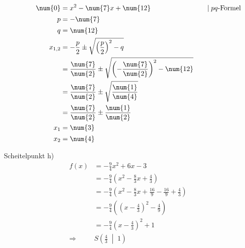 \begin{exercise}
\begin{minipage}[t]{0.49\linewidth}
        \begin{alignat*}{3}
          \noeq
          &
          \num{0}&=x^{2}-\num{7}x+\num{12}
          &
          \domod{\;\text{$pq$-Formel}}
          \\
          \noeq
          &
          p&=-\num{7}
          &
          \nomod
          \\
          \noeq
          &
          q&=\num{12}
          &
          \nomod
          \\
          \noeq
          &
          x_{1,2}&=-\frac{p}{2}\pm\sqrt{\left(\frac{p}{2}\right)^2-q}
          &
          \nomod
          \\
          \noeq
          &
          &=\frac{\num{7}}{\num{2}}\pm\sqrt{\left(-\frac{\num{7}}{\num{2}}\right)^2-\num{12}}
          &
          \nomod
          \\
          \noeq
          &
          &=\frac{\num{7}}{\num{2}}\pm\sqrt{\frac{\num{1}}{\num{4}}}
          &
          \nomod
          \\
          \noeq
          &
          &=\frac{\num{7}}{\num{2}}\pm\frac{\num{1}}{\num{2}}
          &
          \nomod
          \\
          \noeq
          &
          x_1&=\num{3}
          &
          \nomod
          \\
          \noeq
          &
          x_2&=\num{4}
          &
          \nomod
        \end{alignat*}
      \endgroup
    \end{minipage}\bigskip\par
    \begin{minipage}[t]{0.49\linewidth}
      Scheitelpunkt h)
      \small
      \begin{equation*}
        \begin{split}
          f(x)&=-\frac{9}{4}x^2+6x-3
          \\[1ex]
          &=-\frac{9}{4}\left(x^2-\frac{8}{3}x+\frac{4}{3}\right)
          \\[1ex]
          &=-\frac{9}{4}\left(x^2-\frac{8}{3}x+\frac{16}{9}-\frac{16}{9}+\frac{4}{3}\right)
          \\[1ex]
          &=-\frac{9}{4}\left(\left(x-\frac{4}{3}\right)^2-\frac{4}{9}\right)
          \\[1ex]
          &=-\frac{9}{4}\left(x-\frac{4}{3}\right)^2+1
          \\[2ex]
          \Rightarrow\quad&S\left(\frac{4}{3}\;\middle|\;1\right)

\end{split}
\end{equation*}
\end{minipage}
\end{exercise}
